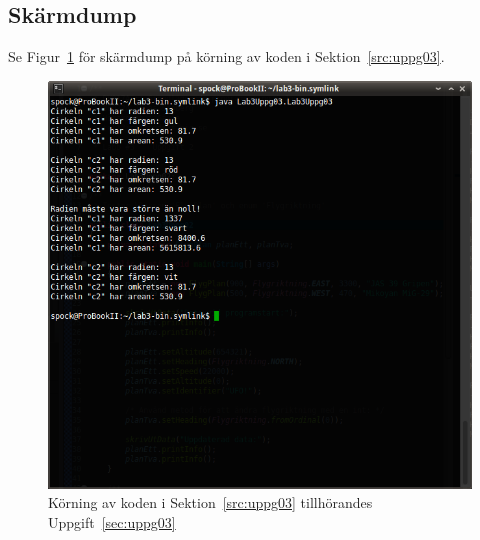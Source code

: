 \subsection{Skärmdump}
Se Figur~\ref{fig:uppg03-screenshot} för skärmdump på körning av koden i
Sektion~\ref{src:uppg03}.

\begin{figure}[htbp]
    \centering
        \includegraphics[width=\linewidth]{img/03.png}
        \caption{Körning av koden i Sektion~\ref{src:uppg03} tillhörandes Uppgift~\ref{sec:uppg03}}
    \label{fig:uppg03-screenshot}
\end{figure}

